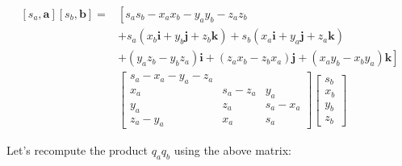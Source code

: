 $$
    \begin{aligned}
        {\left[s_{a}, \mathbf{a}\right]\left[s_{b}, \mathbf{b}\right]=} & {\left[s_{a} s_{b}-x_{a} x_{b}-y_{a} y_{b}-z_{a} z_{b}\right.}                                                                                                \\
                                                                        & +s_{a}\left(x_{b} \mathbf{i}+y_{b} \mathbf{j}+z_{b} \mathbf{k}\right)+s_{b}\left(x_{a} \mathbf{i}+y_{a} \mathbf{j}+z_{a} \mathbf{k}\right)                    \\
                                                                        & \left.+\left(y_{a} z_{b}-y_{b} z_{a}\right) \mathbf{i}+\left(z_{a} x_{b}-z_{b} x_{a}\right) \mathbf{j}+\left(x_{a} y_{b}-x_{b} y_{a}\right) \mathbf{k}\right] \\
                                                                        & {\left[\begin{array}{rrr}
                        s_{a}-x_{a}-y_{a}-z_{a}                 \\
                        x_{a}       & s_{a}-z_{a} & y_{a}       \\
                        y_{a}       & z_{a}       & s_{a}-x_{a} \\
                        z_{a}-y_{a} & x_{a}       & s_{a}
                    \end{array}\right]\left[\begin{array}{c}
                        s_{b} \\
                        x_{b} \\
                        y_{b} \\
                        z_{b}
                    \end{array}\right] }
    \end{aligned}
$$

Let's recompute the product $q_{a} q_{b}$ using the above matrix:

